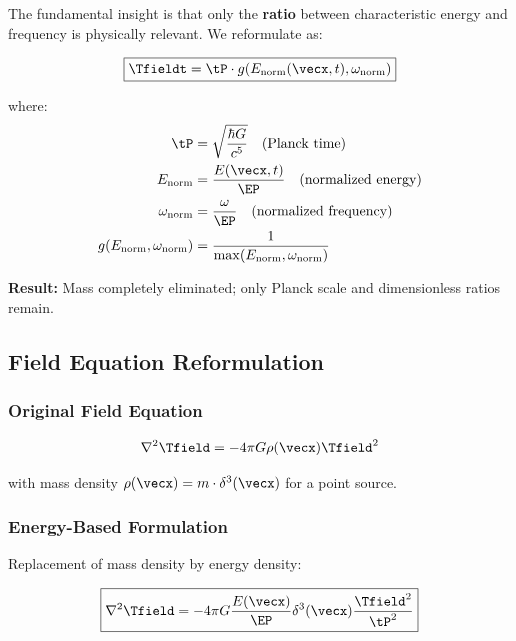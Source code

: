 	The fundamental insight is that only the \textbf{ratio} between characteristic energy and frequency is physically relevant. We reformulate as:
	
	\begin{equation}
		\boxed{\Tfieldt = \tP \cdot g(E_{\text{norm}}(\vecx,t), \omega_{\text{norm}})}
		\label{eq:time_field_mass_free}
	\end{equation}
	
	where:
	\begin{align}
		\tP &= \sqrt{\frac{\hbar G}{c^5}} \quad \text{(Planck time)} \\
		E_{\text{norm}} &= \frac{E(\vecx,t)}{\EP} \quad \text{(normalized energy)} \\
		\omega_{\text{norm}} &= \frac{\omega}{\EP} \quad \text{(normalized frequency)} \\
		g(E_{\text{norm}}, \omega_{\text{norm}}) &= \frac{1}{\max(E_{\text{norm}}, \omega_{\text{norm}})}
	\end{align}
	
	\textbf{Result:} Mass completely eliminated; only Planck scale and dimensionless ratios remain.
	
	\subsection{Field Equation Reformulation}
	\label{subsec:field_equation_elimination}
	
	\subsubsection{Original Field Equation}
	
	\begin{equation}
		\nabla^2 \Tfield = -4\pi G \rho(\vecx) \Tfield^2
		\label{eq:field_equation_original}
	\end{equation}
	
	with mass density $\rho(\vecx) = m \cdot \delta^3(\vecx)$ for a point source.
	
	\subsubsection{Energy-Based Formulation}
	
	Replacement of mass density by energy density:
	
	\begin{equation}
		\boxed{\nabla^2 \Tfield = -4\pi G \frac{E(\vecx)}{\EP} \delta^3(\vecx) \frac{\Tfield^2}{\tP^2}}
		\label{eq:field_equation_mass_free}
	\end{equation}
	
